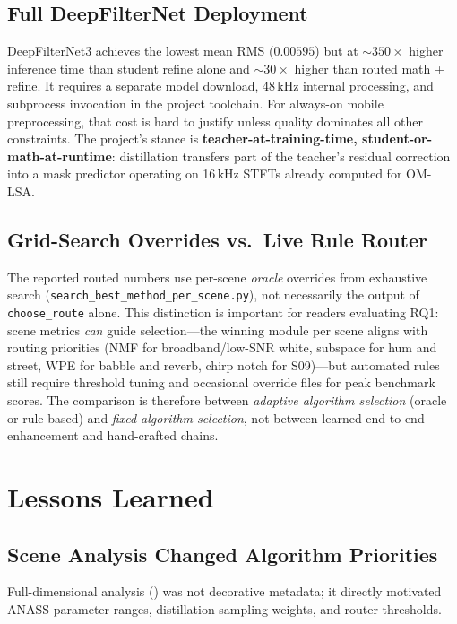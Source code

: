 \subsection{Full DeepFilterNet Deployment}

DeepFilterNet3 achieves the lowest mean RMS ($0.00595$) but at $\sim 350\times$ higher inference time than student refine alone and $\sim 30\times$ higher than routed math + refine. It requires a separate model download, 48\,kHz internal processing, and subprocess invocation in the project toolchain. For always-on mobile preprocessing, that cost is hard to justify unless quality dominates all other constraints. The project's stance is \textbf{teacher-at-training-time, student-or-math-at-runtime}: distillation transfers part of the teacher's residual correction into a mask predictor operating on 16\,kHz STFTs already computed for OM-LSA.

\subsection{Grid-Search Overrides vs.\ Live Rule Router}

The reported routed numbers use per-scene \emph{oracle} overrides from exhaustive search (\texttt{search\_best\_method\_per\_scene.py}), not necessarily the output of \texttt{choose\_route} alone. This distinction is important for readers evaluating RQ1: scene metrics \emph{can} guide selection---the winning module per scene aligns with routing priorities (NMF for broadband/low-SNR white, subspace for hum and street, WPE for babble and reverb, chirp notch for S09)---but automated rules still require threshold tuning and occasional override files for peak benchmark scores. The comparison is therefore between \emph{adaptive algorithm selection} (oracle or rule-based) and \emph{fixed algorithm selection}, not between learned end-to-end enhancement and hand-crafted chains.

\section{Lessons Learned}
\label{sec:lessons}

\subsection{Scene Analysis Changed Algorithm Priorities}

Full-dimensional analysis () was not decorative metadata; it directly motivated ANASS parameter ranges, distillation sampling weights, and router thresholds.

